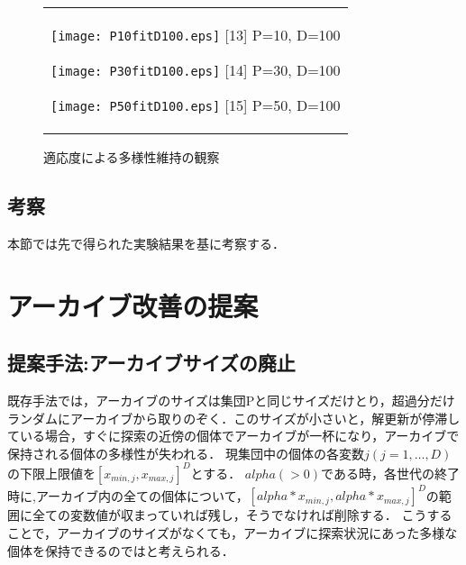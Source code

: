 \documentclass[a4paper,11pt,oneside,openany]{jsbook}
\begin{document}
\begin{figure}[htbp]
  \begin{center}
    \begin{tabular}{c}

      \begin{minipage}{0.33\hsize}
        \begin{center}
          \texttt{[image: P10fitD100.eps]}
          \hspace{1.2cm} [13] P=10, D=100
        \end{center}
      \end{minipage}

      \begin{minipage}{0.33\hsize}
        \begin{center}
          \texttt{[image: P30fitD100.eps]}
          \hspace{1.2cm} [14] P=30, D=100
        \end{center}
      \end{minipage}

      \begin{minipage}{0.33\hsize}
        \begin{center}
          \texttt{[image: P50fitD100.eps]}
          \hspace{1.2cm} [15] P=50, D=100
        \end{center}
      \end{minipage}
    \end{tabular}
    \caption{適応度による多様性維持の観察}
    \label{fig:lena}
  \end{center}
\end{figure}

\section{考察}
本節では先で得られた実験結果を基に考察する．

\chapter{アーカイブ改善の提案}
\section{提案手法:アーカイブサイズの廃止}
既存手法では，アーカイブのサイズは集団Pと同じサイズだけとり，超過分だけランダムにアーカイブから取りのぞく．このサイズが小さいと，解更新が停滞している場合，すぐに探索の近傍の個体でアーカイブが一杯になり，アーカイブで保持される個体の多様性が失われる．
現集団中の個体の各変数$j(j = 1, \dots,D)$の下限上限値を$[x_{min,j},x_{max,j}]^D$とする．
$alpha(>0)$である時，各世代の終了時に,アーカイブ内の全ての個体について，$[alpha *x_{min,j},alpha*x_{max,j}]^D$の範囲に全ての変数値が収まっていれば残し，そうでなければ削除する．
こうすることで，アーカイブのサイズがなくても，アーカイブに探索状況にあった多様な個体を保持できるのではと考えられる．
\end{document}
